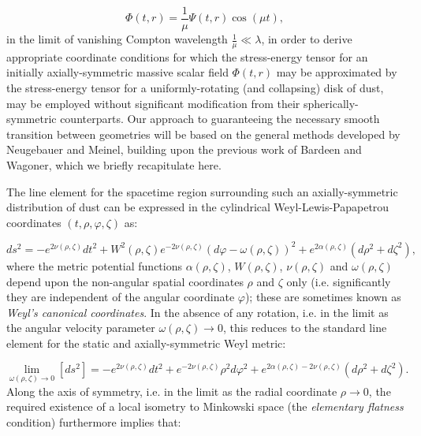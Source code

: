 \documentclass{article}
\begin{document}
\begin{equation}
\Phi \left( t, r \right) = \frac{1}{\mu} \Psi \left( t, r \right) \cos \left( \mu t \right),
\end{equation}
 in the limit of vanishing Compton wavelength ${\frac{1}{\mu} \ll \lambda}$, in order to derive appropriate coordinate conditions for which the stress-energy tensor for an initially axially-symmetric massive scalar field ${\Phi \left( t, r \right)}$ may be approximated by the stress-energy tensor for a uniformly-rotating (and collapsing) disk of dust, may be employed without significant modification from their spherically-symmetric counterparts. Our approach to guaranteeing the necessary smooth transition between geometries will be based on the general methods developed by Neugebauer and Meinel\cite{neugebauer}\cite{neugebauer2}\cite{neugebauer3}, building upon the previous work of Bardeen and Wagoner\cite{bardeen}\cite{bardeen2}, which we briefly recapitulate here.

The line element for the spacetime region surrounding such an axially-symmetric distribution of dust can be expressed in the cylindrical Weyl-Lewis-Papapetrou coordinates ${\left( t, \rho, \varphi, \zeta \right)}$ as:

\begin{equation}
d s^2 = -e^{2 \nu \left( \rho, \zeta \right)} d t^2 + W^2 \left( \rho, \zeta \right) e^{-2 \nu \left( \rho, \zeta \right)} \left( d \varphi - \omega \left( \rho, \zeta \right) \right)^2 + e^{2 \alpha \left( \rho, \zeta \right)} \left( d \rho^2 + d \zeta^2 \right),
\end{equation}
where the metric potential functions ${\alpha \left( \rho, \zeta \right)}$, ${W \left( \rho, \zeta \right)}$, ${\nu \left( \rho, \zeta \right)}$ and ${\omega \left( \rho, \zeta \right)}$ depend upon the non-angular spatial coordinates ${\rho}$ and ${\zeta}$ only (i.e. significantly they are independent of the angular coordinate ${\varphi}$); these are sometimes known as \textit{Weyl's canonical coordinates}\cite{weyl}. In the absence of any rotation, i.e. in the limit as the angular velocity parameter ${\omega \left( \rho, \zeta \right) \to 0}$, this reduces to the standard line element for the static and axially-symmetric Weyl metric:

\begin{equation}
\lim_{\omega \left( \rho, \zeta \right) \to 0} \left[ d s^2 \right] = -e^{2 \nu \left( \rho, \zeta \right)} d t^2 + e^{-2 \nu \left( \rho, \zeta \right)} \rho^2 d \varphi^2 + e^{2 \alpha \left( \rho, \zeta \right) - 2 \nu \left( \rho, \zeta \right)} \left( d \rho^2 + d \zeta^2 \right).
\end{equation}
Along the axis of symmetry, i.e. in the limit as the radial coordinate ${\rho \to 0}$, the required existence of a local isometry to Minkowski space (the \textit{elementary flatness} condition) furthermore implies that:
\end{document}
